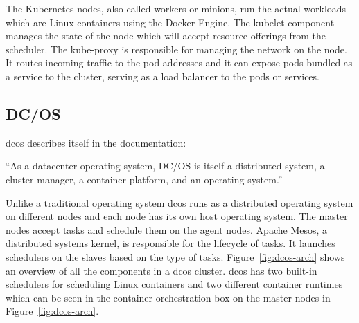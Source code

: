 The Kubernetes nodes, also called workers or minions, run the actual workloads which are Linux containers using the Docker Engine. The kubelet component manages the state of the node which will accept resource offerings from the scheduler. The kube-proxy is responsible for managing the network on the node. It routes incoming traffic to the pod addresses and it can expose pods bundled as a service to the cluster, serving as a load balancer to the pods or services. 

\subsection{DC/OS}
\label{subsec:dcos}
\Gls{dcos} describes itself in the documentation\cite{dcos_what}: 
\begin{displayquote}
``As a datacenter operating system, DC/OS is itself a distributed system, a cluster manager, a container platform, and an operating system.''
\end{displayquote} 
Unlike a traditional operating system \gls{dcos} runs as a distributed operating system on different nodes and each node has its own host operating system. The master nodes accept tasks and schedule them on the agent nodes. Apache Mesos\cite{apache_mesos}, a distributed systems kernel, is responsible for the lifecycle of tasks. It launches schedulers on the slaves based on the type of tasks. Figure~\ref{fig:dcos-arch} shows an overview of all the components in a \gls{dcos} cluster. \Gls{dcos} has two built-in schedulers for scheduling Linux containers and two different container runtimes which can be seen in the container orchestration box on the master nodes in Figure~\ref{fig:dcos-arch}. 


